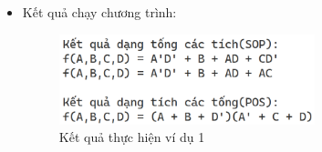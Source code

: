 \documentclass[titlepage]{article} %
\begin{document}
\begin{enumerate}
\begin{itemize}
        \item Kết quả chạy chương trình:
        \begin{figure}[H] \vspace{-0.5cm}
    	\centering
    	\includegraphics[width=0.7\textwidth]{ket_qua_1.png}
    	\caption[Kết quả thực hiện ví dụ 1]{\centering Kết quả thực hiện ví dụ 1} \label{img:ket_qua_1}
        \end{figure} \vspace{-0.5cm}  
    \end{itemize}
    

\end{enumerate}
\end{document}

